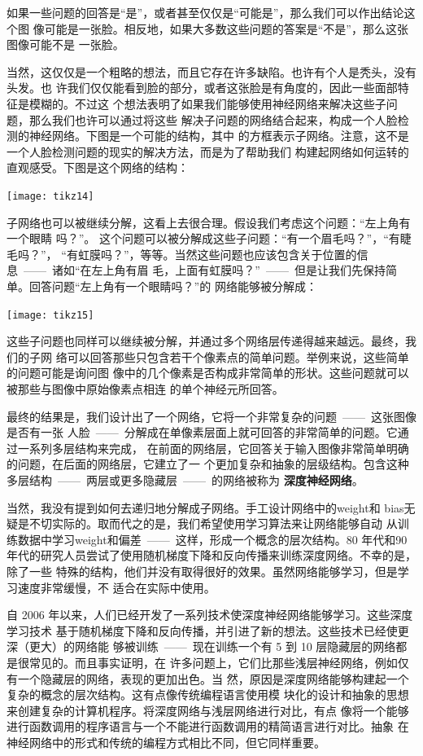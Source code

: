 如果一些问题的回答是“是”，或者甚至仅仅是“可能是”，那么我们可以作出结论这个图
像可能是一张脸。相反地，如果大多数这些问题的答案是“不是”，那么这张图像可能不是
一张脸。

当然，这仅仅是一个粗略的想法，而且它存在许多缺陷。也许有个人是秃头，没有头发。也
许我们仅仅能看到脸的部分，或者这张脸是有角度的，因此一些面部特征是模糊的。不过这
个想法表明了如果我们能够使用神经网络来解决这些子问题，那么我们也许可以通过将这些
解决子问题的网络结合起来，构成一个人脸检测的神经网络。下图是一个可能的结构，其中
的方框表示子网络。注意，这不是一个人脸检测问题的现实的解决方法，而是为了帮助我们
构建起网络如何运转的直观感受。下图是这个网络的结构：

\begin{center}
  \texttt{[image: tikz14]}
\end{center}

子网络也可以被继续分解，这看上去很合理。假设我们考虑这个问题：“左上角有一个眼睛
吗？”。 这个问题可以被分解成这些子问题：“有一个眉毛吗？”，“有睫毛吗？”，
“有虹膜吗？”，等等。当然这些问题也应该包含关于位置的信息~——~诸如“在左上角有眉
毛，上面有虹膜吗？”~——~但是让我们先保持简单。回答问题“左上角有一个眼睛吗？”的
网络能够被分解成：

\begin{center}
  \texttt{[image: tikz15]}
\end{center}

这些子问题也同样可以继续被分解，并通过多个网络层传递得越来越远。最终，我们的子网
络可以回答那些只包含若干个像素点的简单问题。举例来说，这些简单的问题可能是询问图
像中的几个像素是否构成非常简单的形状。这些问题就可以被那些与图像中原始像素点相连
的单个神经元所回答。

最终的结果是，我们设计出了一个网络，它将一个非常复杂的问题~——~这张图像是否有一张
人脸~——~分解成在单像素层面上就可回答的非常简单的问题。它通过一系列多层结构来完成，
在前面的网络层，它回答关于输入图像非常简单明确的问题，在后面的网络层，它建立了一
个更加复杂和抽象的层级结构。包含这种多层结构~——~两层或更多隐藏层~——~的网络被称为%
\textbf{深度神经网络}。

当然，我没有提到如何去递归地分解成子网络。手工设计网络中的\gls*{weight}和%
\gls*{bias}无疑是不切实际的。取而代之的是，我们希望使用学习算法来让网络能够自动
从训练数据中学习\gls*{weight}和偏差~——~这样，形成一个概念的层次结构。80 年代和90
年代的研究人员尝试了使用随机梯度下降和反向传播来训练深度网络。不幸的是，除了一些
特殊的结构，他们并没有取得很好的效果。虽然网络能够学习，但是学习速度非常缓慢，不
适合在实际中使用。

自 2006 年以来，人们已经开发了一系列技术使深度神经网络能够学习。这些深度学习技术
基于随机梯度下降和反向传播，并引进了新的想法。这些技术已经使更深（更大）的网络能
够被训练~——~现在训练一个有 5 到 10 层隐藏层的网络都是很常见的。而且事实证明，在
许多问题上，它们比那些浅层神经网络，例如仅有一个隐藏层的网络，表现的更加出色。当
然，原因是深度网络能够构建起一个复杂的概念的层次结构。这有点像传统编程语言使用模
块化的设计和抽象的思想来创建复杂的计算机程序。将深度网络与浅层网络进行对比，有点
像将一个能够进行函数调用的程序语言与一个不能进行函数调用的精简语言进行对比。抽象
在神经网络中的形式和传统的编程方式相比不同，但它同样重要。
